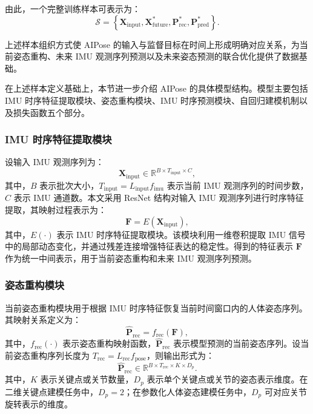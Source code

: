 由此，一个完整训练样本可表示为：
\begin{equation}
\mathcal{S}
=
\left\{
\mathbf{X}_{\mathrm{input}},
\mathbf{X}_{\mathrm{future}}^{\ast},
\mathbf{P}_{\mathrm{rec}}^{\ast},
\mathbf{P}_{\mathrm{pred}}^{\ast}
\right\}.
\label{eq:sample_set}
\end{equation}

上述样本组织方式使 AIPose 的输入与监督目标在时间上形成明确对应关系，为当前姿态重构、未来 IMU 观测序列预测以及未来姿态预测的联合优化提供了数据基础。


在上述样本定义基础上，本节进一步介绍 AIPose 的具体模型结构。模型主要包括 IMU 时序特征提取模块、姿态重构模块、IMU 时序预测模块、自回归建模机制以及损失函数五个部分。

\subsubsection{IMU 时序特征提取模块}{}

设输入 IMU 观测序列为：
\begin{equation}
\mathbf{X}_{\mathrm{input}} \in \mathbb{R}^{B \times T_{\mathrm{input}} \times C},
\label{eq:input_imu}
\end{equation}
其中，$B$ 表示批次大小，$T_{\mathrm{input}}=L_{\mathrm{input}}f_{\mathrm{imu}}$ 表示当前 IMU 观测序列的时间步数，$C$ 表示 IMU 通道数。本文采用 ResNet 结构对输入 IMU 观测序列进行时序特征提取，其映射过程表示为：
\begin{equation}
\mathbf{F} = E(\mathbf{X}_{\mathrm{input}}),
\label{eq:feature_extract}
\end{equation}
其中，$E(\cdot)$ 表示 IMU 时序特征提取模块。该模块利用一维卷积提取 IMU 信号中的局部动态变化，并通过残差连接增强特征表达的稳定性。得到的特征表示 $\mathbf{F}$ 作为统一中间表示，用于当前姿态重构和未来 IMU 观测序列预测。

\subsubsection{姿态重构模块}{}

当前姿态重构模块用于根据 IMU 时序特征恢复当前时间窗口内的人体姿态序列。其映射关系定义为：
\begin{equation}
\hat{\mathbf{P}}_{\mathrm{rec}} = f_{\mathrm{rec}}(\mathbf{F}),
\label{eq:pose_reconstruction}
\end{equation}
其中，$f_{\mathrm{rec}}(\cdot)$ 表示姿态重构映射函数，$\hat{\mathbf{P}}_{\mathrm{rec}}$ 表示模型预测的当前姿态序列。设当前姿态重构序列长度为 $T_{\mathrm{rec}}=L_{\mathrm{rec}}f_{\mathrm{pose}}$，则输出形式为：
\begin{equation}
\hat{\mathbf{P}}_{\mathrm{rec}} \in \mathbb{R}^{B \times T_{\mathrm{rec}} \times K \times D_p}.
\label{eq:pose_shape}
\end{equation}
其中，$K$ 表示关键点或关节数量，$D_p$ 表示单个关键点或关节的姿态表示维度。在二维关键点建模任务中，$D_p=2$；在参数化人体姿态建模任务中，$D_p$ 可对应关节旋转表示的维度。


